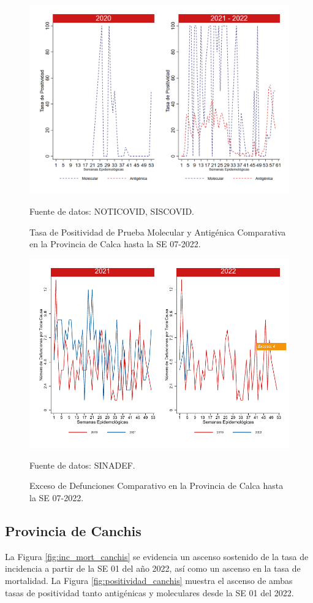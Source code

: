 \documentclass[12pt,a4paper,openany]{book}
\begin{document}
		\begin{figure}[h]
			\caption{Tasa de Positividad de Prueba Molecular y Antigénica Comparativa en la Provincia de Calca hasta la SE 07-2022.}\label{fig:positividad_calca}
			\begin{center}
				\includegraphics[width=0.7\linewidth]{../figuras/positividad_20_21_4.png}
			\end{center}
			{\footnotesize {Fuente de datos: NOTICOVID, SISCOVID.}}
		\end{figure}
		
		\begin{figure}[h]
			\caption{Exceso de Defunciones Comparativo en la Provincia de Calca hasta la SE 07-2022.}\label{fig:exceso_calca}
			\begin{center}
				\includegraphics[width=0.7\linewidth]{../figuras/exceso_4.pdf}
			\end{center}
			{\footnotesize {Fuente de datos: SINADEF.}}
		\end{figure}
		
		\clearpage
		
		\subsection*{Provincia de Canchis}
		\noindent La Figura \ref{fig:inc_mort_canchis} se evidencia un ascenso sostenido de la tasa de incidencia a partir de la SE 01 del año 2022, así como un ascenso en la tasa de mortalidad. 
		\noindent La Figura \ref{fig:positividad_canchis} muestra el ascenso de ambas tasas de positividad tanto antigénicas y moleculares desde la SE 01 del 2022.
		
\end{document}
